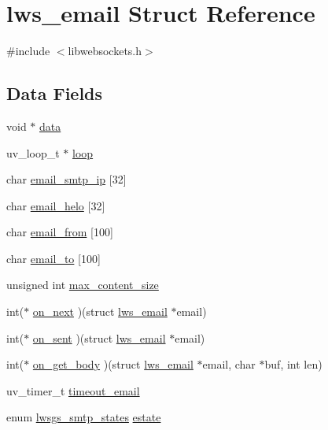 \hypertarget{structlws__email}{}\section{lws\+\_\+email Struct Reference}
\label{structlws__email}


{\ttfamily \#include $<$libwebsockets.\+h$>$}

\subsection*{Data Fields}
\begin{DoxyCompactItemize}
\item 
void $\ast$ \hyperlink{structlws__email_add1341456045382c183f4c763bdea6bc}{data}
\item 
uv\+\_\+loop\+\_\+t $\ast$ \hyperlink{structlws__email_ab5fbf121195a8e67509c78a42cfbe168}{loop}
\item 
char \hyperlink{structlws__email_a472ae23fc9fca6599e5c512bc21458d2}{email\+\_\+smtp\+\_\+ip} \mbox{[}32\mbox{]}
\item 
char \hyperlink{structlws__email_a939e5d7ee0339a16de73bde71ab4d4d9}{email\+\_\+helo} \mbox{[}32\mbox{]}
\item 
char \hyperlink{structlws__email_af7f0ae934347d81071f63a963301f9e2}{email\+\_\+from} \mbox{[}100\mbox{]}
\item 
char \hyperlink{structlws__email_a6453a8b92b3de6d2c2101af3edce685e}{email\+\_\+to} \mbox{[}100\mbox{]}
\item 
unsigned int \hyperlink{structlws__email_a7bbc1964889c984b3da723c86a210e05}{max\+\_\+content\+\_\+size}
\item 
int($\ast$ \hyperlink{structlws__email_ad8dc60353ee246d84dd59ec0591e9719}{on\+\_\+next} )(struct \hyperlink{structlws__email}{lws\+\_\+email} $\ast$email)
\item 
int($\ast$ \hyperlink{structlws__email_a39ef6263d58eb40cca417c8697b227d8}{on\+\_\+sent} )(struct \hyperlink{structlws__email}{lws\+\_\+email} $\ast$email)
\item 
int($\ast$ \hyperlink{structlws__email_a2aff78c8e04db243052aa91b4d87e987}{on\+\_\+get\+\_\+body} )(struct \hyperlink{structlws__email}{lws\+\_\+email} $\ast$email, char $\ast$buf, int len)
\item 
uv\+\_\+timer\+\_\+t \hyperlink{structlws__email_a77723e2f2b940b1c879ef5e1cd88c2be}{timeout\+\_\+email}
\item 
enum \hyperlink{group__smtp_ga116be79bf44f9dc2a97f46e051fe4dc0}{lwsgs\+\_\+smtp\+\_\+states} \hyperlink{structlws__email_ac6115d3cbef2e8bac62cc00895bf5fd3}{estate}

\end{DoxyCompactItemize}
